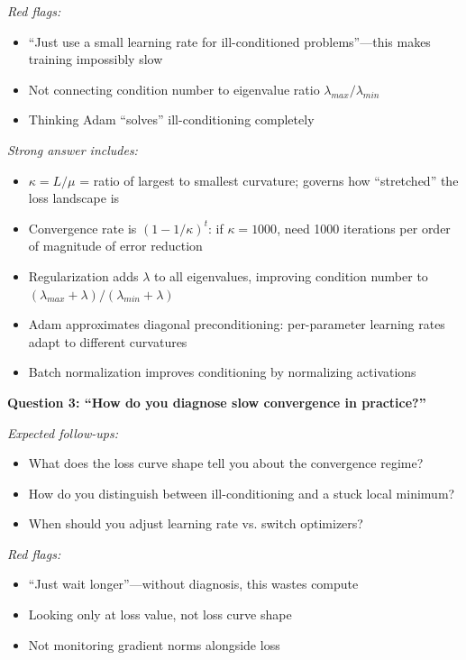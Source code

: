 \documentclass[../../main.tex]{subfiles}
\begin{document}
\begin{interviewquestions}
\textit{Red flags:}
\begin{itemize}
    \item ``Just use a small learning rate for ill-conditioned problems''---this makes training impossibly slow
    \item Not connecting condition number to eigenvalue ratio $\lambda_{max}/\lambda_{min}$
    \item Thinking Adam ``solves'' ill-conditioning completely
\end{itemize}

\textit{Strong answer includes:}
\begin{itemize}
    \item $\kappa = L/\mu$ = ratio of largest to smallest curvature; governs how ``stretched'' the loss landscape is
    \item Convergence rate is $(1 - 1/\kappa)^t$: if $\kappa = 1000$, need 1000 iterations per order of magnitude of error reduction
    \item Regularization adds $\lambda$ to all eigenvalues, improving condition number to $(\lambda_{max} + \lambda)/(\lambda_{min} + \lambda)$
    \item Adam approximates diagonal preconditioning: per-parameter learning rates adapt to different curvatures
    \item Batch normalization improves conditioning by normalizing activations
\end{itemize}

\textbf{Question 3: ``How do you diagnose slow convergence in practice?''}

\textit{Expected follow-ups:}
\begin{itemize}
    \item What does the loss curve shape tell you about the convergence regime?
    \item How do you distinguish between ill-conditioning and a stuck local minimum?
    \item When should you adjust learning rate vs. switch optimizers?
\end{itemize}

\textit{Red flags:}
\begin{itemize}
    \item ``Just wait longer''---without diagnosis, this wastes compute
    \item Looking only at loss value, not loss curve shape
    \item Not monitoring gradient norms alongside loss
\end{itemize}


\end{interviewquestions}
\end{document}
